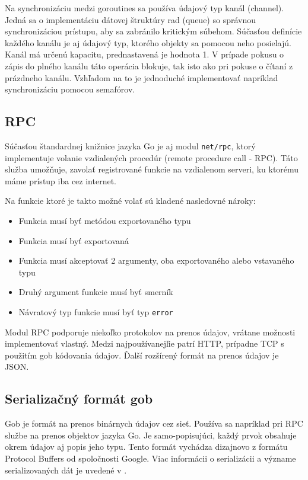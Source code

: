Na synchronizáciu medzi goroutines sa používa údajový typ kanál (channel). Jedná sa o
implementáciu dátovej štruktúry rad (queue) so správnou synchronizáciou prístupu,
aby sa zabránilo kritickým súbehom. Súčasťou definície každého kanálu je aj údajový
typ, ktorého objekty sa pomocou neho posielajú. Kanál má určenú kapacitu, prednastavená
je hodnota 1. V prípade pokusu o zápis do plného kanálu táto operácia blokuje, tak isto
ako pri pokuse o čítaní z prázdneho kanálu. Vzhľadom na to je jednoduché implementovať
napríklad synchronizáciu pomocou semafórov.

\subsection{RPC}
\label{sec:golang:rpc}

Súčasťou štandardnej knižnice jazyka Go je aj modul \texttt{net/rpc}, ktorý implementuje
volanie vzdialených procedúr (remote procedure call - RPC). Táto služba umožňuje, zavolať
registrované funkcie na vzdialenom serveri, ku ktorému máme prístup iba cez internet.

Na funkcie ktoré je takto možné volať sú kladené nasledovné nároky:

\begin{itemize}
  \item Funkcia musí byť metódou exportovaného typu
  \item Funkcia musí byť exportovaná
  \item Funkcia musí akceptovať 2 argumenty, oba exportovaného alebo vstavaného typu
  \item Druhý argument funkcie musí byť smerník
  \item Návratový typ funkcie musí byť typ \texttt{error}
\end{itemize}

Modul RPC podporuje niekoľko protokolov na prenos údajov, vrátane možnosti implementovať
vlastný. Medzi najpoužívanejľie patrí HTTP, prípadne TCP s použitím gob kódovania údajov.
Ďalší rozšírený formát na prenos údajov je JSON.

\subsection{Serializačný formát gob}
\label{sec:golang:gob}

Gob je formát na prenos binárnych údajov cez sieť. Používa sa napríklad
pri RPC službe na prenos objektov jazyka Go. Je samo-popisujúci, každý prvok obsahuje
okrem údajov aj popis jeho typu. Tento formát vychádza dizajnovo z formátu Protocol
Buffers od spoločnosti Google. Viac informácii o serializácii a význame serializovaných
dát je uvedené v \cite{GolangGobs}.

